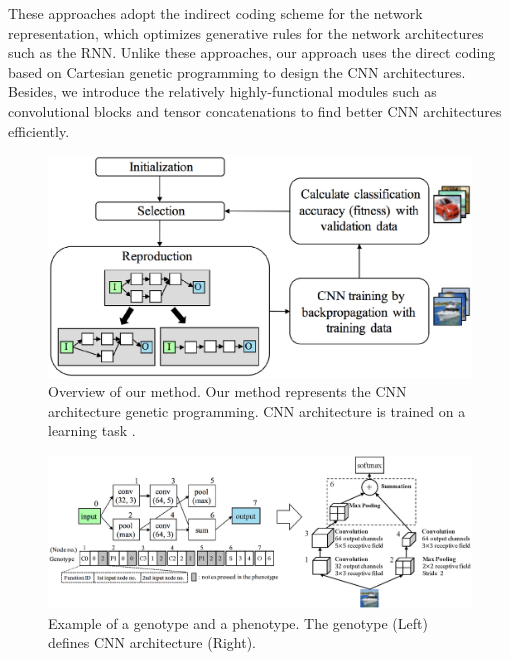 These approaches adopt the indirect coding scheme for the network representation, which optimizes generative rules for the network architectures such as the RNN.
Unlike these approaches, our approach uses the direct coding based on Cartesian genetic programming to design the CNN architectures.
Besides, we introduce the relatively highly-functional modules such as convolutional blocks and tensor concatenations to find better CNN architectures efficiently.

\begin{figure}[t]
\includegraphics[scale=0.45]{images/overview.eps}
\caption{Overview of our method. Our method represents the CNN architecture  genetic programming.  CNN architecture is trained on a learning task . }
\label{overview}
\end{figure}


\begin{figure}[t]
\includegraphics[scale=0.65]{images/genotype.eps}
\caption{Example of a genotype and a phenotype. The genotype (Left) defines  CNN architecture (Right). }
\label{genotype}
\end{figure}

